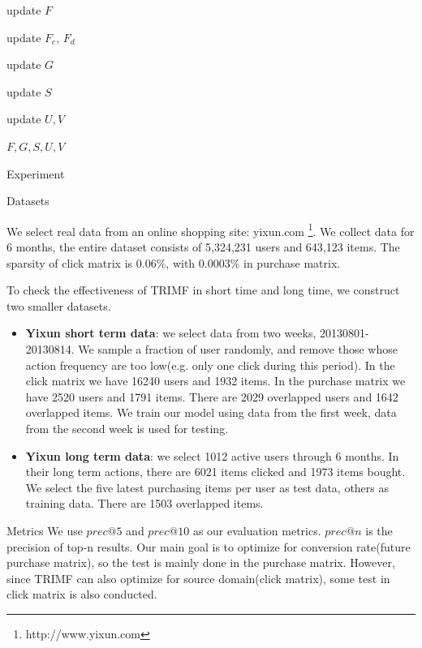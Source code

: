 \begin{section}
\begin{algorithm}[tb]
\begin{algorithmic}

\STATE update $F$

\STATE update $F_c$, $F_d$

\STATE  update $G$

\STATE  update $S$

\STATE  update $U, V$


\ENDFOR

 $F,G,S,U,V$

\end{algorithmic}
\label{algorithm:TRIMF}
\end{algorithm}

\end{section}
\begin{section}{Experiment}
  \begin{subsection}{Datasets}

We select real data from an online shopping site: yixun.com \footnote{http://www.yixun.com}. We collect data for 6 months, the entire dataset consists of 5,324,231 users and 643,123 items. The sparsity of click matrix is $0.06\%$, with $0.0003\%$ in purchase matrix.

To check the effectiveness of TRIMF in short time and long time, we construct two smaller datasets.

\begin{itemize}

\item \textbf{Yixun short term data}: we select data from two weeks, 20130801-20130814. We sample a fraction of user randomly, and remove those whose action frequency are too low(e.g. only one click during this period). In the click matrix we have 16240 users and 1932 items. In the purchase matrix we have 2520 users and 1791 items. There are 2029 overlapped users and 1642 overlapped items. We train our model using data from the first week, data from the second week is used for testing.
\item \textbf{Yixun long term data}: we select 1012 active users through 6 months. In their long term actions, there are 6021 items clicked and 1973 items bought. We select the five latest purchasing items per user as test data, others as training data. There are 1503 overlapped items.

\end{itemize}
\end{subsection}

\begin{subsection}{Metrics}
We use $prec@5$ and $prec@10$ as our evaluation metrics. $prec@n$ is the precision of top-n results. Our main goal is to optimize for conversion rate(future purchase matrix), so the test is mainly done in the purchase matrix. However, since TRIMF can also optimize for source domain(click matrix), some test in click matrix is also conducted.


\end{subsection}
\end{section}
